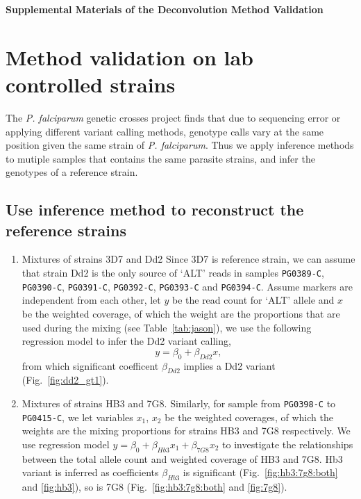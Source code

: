 

\begin{center}
\textbf{\large Supplemental Materials of the Deconvolution Method Validation}
\end{center}

\section{Method validation on lab controlled strains} \label{sup:sec:validate}

The {\em P. falciparum} genetic crosses project \citep{Miles2015:sup} finds that due to sequencing error or applying different variant calling methods, genotype calls vary at the same position given the same strain of {\em P. falciparum}. Thus we apply inference methods to mutiple samples that contains the same parasite strains, and infer the genotypes of a reference strain.


\subsection{Use inference method to reconstruct the reference strains}
\begin{enumerate}
\item Mixtures of strains 3D7 and Dd2
Since 3D7 is reference strain, we can assume that strain Dd2 is the only source of `ALT' reads in samples {\tt PG0389-C}, {\tt PG0390-C}, {\tt PG0391-C}, {\tt PG0392-C}, {\tt PG0393-C} and {\tt PG0394-C}. Assume markers are independent from each other, let $y$ be the read count for `ALT' allele and $x$ be the weighted coverage, of which the weight are the proportions that are used during the mixing (see Table~\ref{tab:jason}), we use the following regression model to infer the Dd2 variant calling, $$y = \beta_0 + \beta_{Dd2} x,$$
from which significant coefficent $\beta_{Dd2}$ implies a Dd2 variant (Fig.~\ref{fig:dd2_gt1}).

\item Mixtures of strains HB3 and 7G8.
Similarly, for sample from {\tt PG0398-C} to {\tt PG0415-C},  we let variables $x_1$, $x_2$ be the weighted coverages, of which the weights are the mixing proportions for strains HB3 and 7G8 respectively. We use regression model $y = \beta_0 + \beta_{Hb3} x_1 + \beta_{7G8} x_2$ to investigate the relationships between the total allele count and weighted coverage of HB3 and 7G8. Hb3 variant is inferred as coefficients $\beta_{Hb3}$ is significant (Fig.~\ref{fig:hb3:7g8:both} and \ref{fig:hb3}), so is 7G8 (Fig.~\ref{fig:hb3:7g8:both} and \ref{fig:7g8}).
\end{enumerate}



